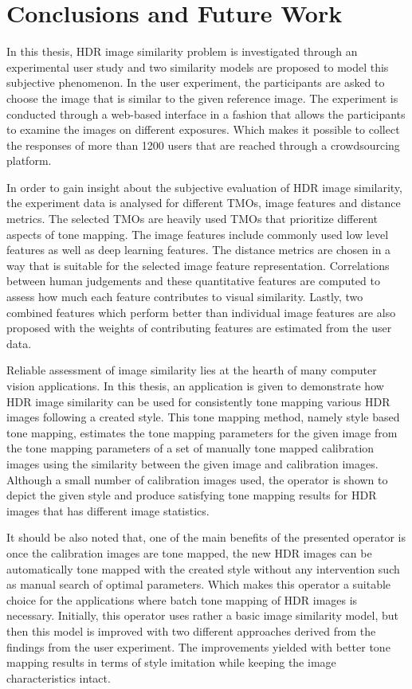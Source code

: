 \chapter{Conclusions and Future Work}
\label{chp:b8}

In this thesis, HDR image similarity problem is investigated through an experimental user study and two similarity models are proposed to model this subjective phenomenon. In the user experiment, the participants are asked to choose the image that is similar to the given reference image. The experiment is conducted through a web-based interface in a fashion that allows the participants to examine the images on different exposures. Which makes it possible to collect the responses of more than 1200 users that are reached through a crowdsourcing platform.

In order to gain insight about the subjective evaluation of HDR image similarity, the experiment data is analysed for different TMOs, image features and distance metrics. The selected TMOs are heavily used TMOs that prioritize different aspects of tone mapping. The image features include commonly used low level features as well as deep learning features. The distance metrics are chosen in a way that is suitable for the selected image feature representation. Correlations between human judgements and these quantitative features are computed to assess how much each feature contributes to visual similarity. Lastly, two combined features which perform better than individual image features are also proposed with the weights of contributing features are estimated from the user data.

Reliable assessment of image similarity lies at the hearth of many computer vision applications. In this thesis, an application is given to demonstrate how HDR image similarity can be used for consistently tone mapping various HDR images following a created style. This tone mapping method, namely style based tone mapping, estimates the tone mapping parameters for the given image from the tone mapping parameters of a set of manually tone mapped calibration images using the similarity between the given image and calibration images. Although a small number of calibration images used, the operator is shown to depict the given style and produce satisfying tone mapping results for HDR images that has different image statistics. 

It should be also noted that, one of the main benefits of the presented operator is once the calibration images are tone mapped, the new HDR images can be automatically tone mapped with the created style without any intervention such as manual search of optimal parameters. Which makes this operator a suitable choice for the applications where batch tone mapping of HDR images is necessary. Initially, this operator uses rather a basic image similarity model, but then this model is improved with two different approaches derived from the findings from the user experiment. The improvements yielded with better tone mapping results in terms of style imitation while keeping the image characteristics intact. 

